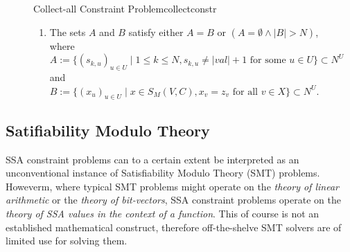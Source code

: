 \begin{figure}[p]
\begin{definition}{Collect-all Constraint Problem}{collectconstr}
\begin{enumerate}
        \item The sets $A$ and $B$ satisfy either $A=B$ or $(A=\emptyset\mathrel\land |B|>N)$, where\\
              $A:=\{(s_{k,u})_{u\in U}\mid 1\leq k\leq N, s_{k,u}\neq|val|+1\text{ for some }u\in U\}\subset N^U$ and\\
              $B:=\{(x_u)_{u\in U}\mid x\in S_M(V,C), x_v=z_v\text{ for all }v\in X\}\subset N^U$.
        \end{enumerate}
    \end{definition}
\end{figure}

\subsection{Satifiability Modulo Theory}

    SSA constraint problems can to a certain extent be interpreted as an
    unconventional instance of Satisfiability Modulo Theory (SMT) problems.
    Howeverm, where typical SMT problems might operate on the
    {\em theory of linear arithmetic} or the {\em theory of bit-vectors},
    SSA constraint problems operate on the {\em theory of SSA values in the
    context of a function}.
    This of course is not an established mathematical construct, therefore
    off-the-shelve SMT solvers are of limited use for solving them.

